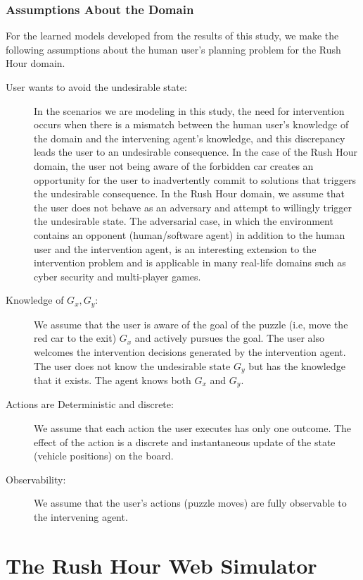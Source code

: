 \subsubsection*{Assumptions About the Domain}
For the learned models developed from the results of this study, we make the following assumptions about the human user's planning problem for the Rush Hour domain.
\begin{description}
\item [User wants to avoid the undesirable state:]
In the scenarios we are modeling in this study, the need for intervention occurs when there is a mismatch between the human user's knowledge of the domain and the intervening agent's knowledge, and this discrepancy leads the user to an undesirable consequence. In the case of the Rush Hour domain, the user not being aware of the forbidden car creates an opportunity for the user to inadvertently commit to solutions that triggers the undesirable consequence. In the Rush Hour domain, we assume that the user does not behave as an adversary and attempt to willingly trigger the undesirable state. The adversarial case, in which  the environment contains an opponent (human/software agent) in addition to the human user and the intervention agent, is an interesting extension to the intervention problem and is applicable in many real-life domains such as cyber security and multi-player games.
\item [Knowledge of $G_x, G_y$:] 
We assume that the user is aware of the goal of the puzzle (i.e, move the red car to the exit) $G_x$ and actively pursues the goal. The user also welcomes the intervention decisions generated by the intervention agent. The user does not know the undesirable state $G_y$ but has the knowledge that it exists. The agent knows both $G_x$ and $G_y$.
\item [Actions are Deterministic and discrete:]
We assume that each action the user executes has only one outcome. The effect of the action is a discrete and instantaneous update of the state (vehicle positions) on the board.
\item [Observability:]
We assume that the user's actions (puzzle moves) are fully observable to the intervening agent.
\end{description}

\section*{The Rush Hour Web Simulator}

